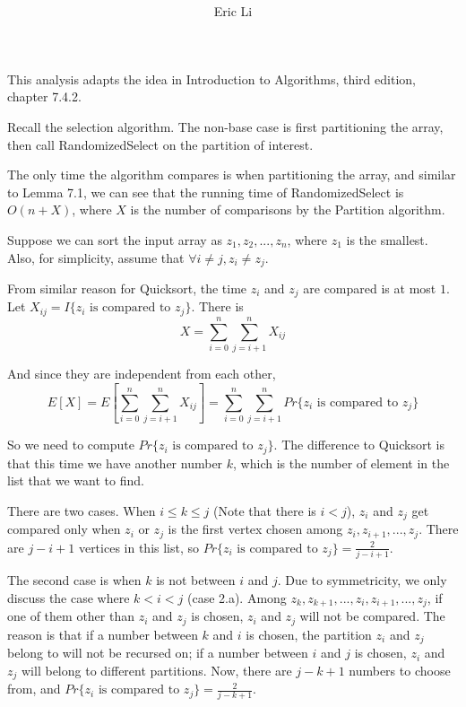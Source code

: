 \documentclass[11pt]{article}
\title{\bf \titleVar{}}
\author{Eric Li}
\begin{document}
\maketitle

\renewcommand\thesubsection{\arabic{section}.\Alph{subsection}}

This analysis adapts the idea in Introduction to Algorithms, third edition,
 chapter 7.4.2. %

Recall the selection algorithm. %
 The non-base case is first partitioning the array, then call RandomizedSelect
 on the partition of interest. 

The only time the algorithm compares is when partitioning the array, and similar
 to Lemma 7.1, we can see that the running time of RandomizedSelect is
 $O(n + X)$, where $X$ is the number of comparisons by the Partition algorithm.

Suppose we can sort the input array as $z_1, z_2, ..., z_n$, where $z_1$ is the
 smallest. Also, for simplicity, assume that $\forall i \neq j, z_i \neq z_j$. 

From similar reason for Quicksort, the time $z_i$ and $z_j$ are compared is at
 most $1$. Let $X_{ij} = I\{z_i \text{ is compared to } z_j\}$. There is
 $$X = \sum_{i=0}^n{\sum_{j=i+1}^n{X_{ij}}}$$

And since they are independent from each other, 
 $$E[X] = E\left[\sum_{i=0}^n{\sum_{j=i+1}^n{X_{ij}}}\right]
 		 = \sum_{i=0}^n{\sum_{j=i+1}^n{Pr\{z_i \text{ is compared to } z_j\}}}$$

So we need to compute $Pr\{z_i \text{ is compared to } z_j\}$. The difference
 to Quicksort is that this time we have another number $k$, which is the number
 of element in the list that we want to find. 

There are two cases. When $i \le k \le j$ (Note that there is $i < j$), $z_i$
 and $z_j$ get compared only when $z_i$ or $z_j$ is the first vertex chosen
 among $z_i, z_{i+1}, ..., z_j$. There are $j - i + 1$ vertices in this list,
 so $Pr\{z_i \text{ is compared to } z_j\} = \displaystyle\frac{2}{j-i+1}$. 

The second case is when $k$ is not between $i$ and $j$. Due to symmetricity, we
 only discuss the case where $k < i < j$ (case 2.a).
 Among $z_k, z_{k+1}, ..., z_i, z_{i+1}, ..., z_j$, if one of them other than
 $z_i$ and $z_j$ is chosen, $z_i$ and $z_j$ will not be compared. 
 The reason is that if a number between $k$ and $i$ is chosen, the partition
 $z_i$ and $z_j$ belong to will not be recursed on; if a number between $i$ and
 $j$ is chosen, $z_i$ and $z_j$ will belong to different partitions. Now, there
 are $j - k + 1$ numbers to choose from, and
 $Pr\{z_i \text{ is compared to } z_j\} = \displaystyle\frac{2}{j-k+1}$. 
\end{document}
